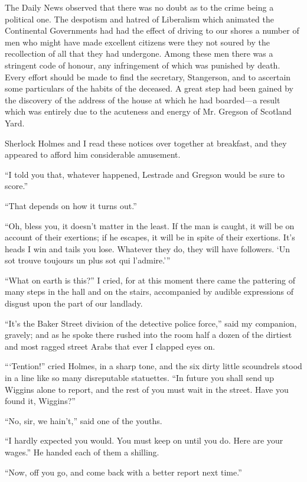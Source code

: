 \documentclass[12pt]{book}
\begin{document}
The Daily News observed that there was no doubt as to the crime being a political one. The despotism and hatred of Liberalism which animated the Continental Governments had had the effect of driving to our shores a number of men who might have made excellent citizens were they not soured by the recollection of all that they had undergone. Among these men there was a stringent code of honour, any infringement of which was punished by death. Every effort should be made to find the secretary, Stangerson, and to ascertain some particulars of the habits of the deceased. A great step had been gained by the discovery of the address of the house at which he had boarded—a result which was entirely due to the acuteness and energy of Mr. Gregson of Scotland Yard. 

Sherlock Holmes and I read these notices over together at breakfast, and they appeared to afford him considerable amusement. 

“I told you that, whatever happened, Lestrade and Gregson would be sure to score.” 

“That depends on how it turns out.” 

“Oh, bless you, it doesn’t matter in the least. If the man is caught, it will be on account of their exertions; if he escapes, it will be in spite of their exertions. It’s heads I win and tails you lose. Whatever they do, they will have followers. ‘Un sot trouve toujours un plus sot qui l’admire.’” 

“What on earth is this?” I cried, for at this moment there came the pattering of many steps in the hall and on the stairs, accompanied by audible expressions of disgust upon the part of our landlady. 

“It’s the Baker Street division of the detective police force,” said my companion, gravely; and as he spoke there rushed into the room half a dozen of the dirtiest and most ragged street Arabs that ever I clapped eyes on. 

“‘Tention!” cried Holmes, in a sharp tone, and the six dirty little scoundrels stood in a line like so many disreputable statuettes. “In future you shall send up Wiggins alone to report, and the rest of you must wait in the street. Have you found it, Wiggins?” 

“No, sir, we hain’t,” said one of the youths. 

“I hardly expected you would. You must keep on until you do. Here are your wages.” He handed each of them a shilling. 

“Now, off you go, and come back with a better report next time.” 
\end{document}
